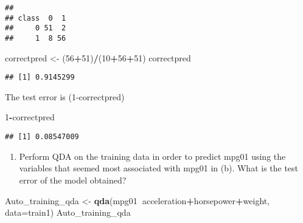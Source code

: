 \documentclass[]{article}
\newenvironment{Shaded}{\begin{snugshade}}{\end{snugshade}}
\newcommand{\KeywordTok}[1]{\textcolor[rgb]{0.13,0.29,0.53}{\textbf{#1}}}
\newcommand{\DataTypeTok}[1]{\textcolor[rgb]{0.13,0.29,0.53}{#1}}
\newcommand{\DecValTok}[1]{\textcolor[rgb]{0.00,0.00,0.81}{#1}}
\newcommand{\StringTok}[1]{\textcolor[rgb]{0.31,0.60,0.02}{#1}}
\newcommand{\CommentTok}[1]{\textcolor[rgb]{0.56,0.35,0.01}{\textit{#1}}}
\newcommand{\OperatorTok}[1]{\textcolor[rgb]{0.81,0.36,0.00}{\textbf{#1}}}
\newcommand{\NormalTok}[1]{#1}
\providecommand{\tightlist}{%
  \setlength{\itemsep}{0pt}\setlength{\parskip}{0pt}}
\begin{document}
\begin{Shaded}
\end{Shaded}

\begin{verbatim}
##      
## class  0  1
##     0 51  2
##     1  8 56
\end{verbatim}

\begin{Shaded}
\begin{Highlighting}[]
\NormalTok{correctpred <-}\StringTok{ }\NormalTok{(}\DecValTok{56}\OperatorTok{+}\DecValTok{51}\NormalTok{)}\OperatorTok{/}\NormalTok{(}\DecValTok{10}\OperatorTok{+}\DecValTok{56}\OperatorTok{+}\DecValTok{51}\NormalTok{)}
\NormalTok{correctpred}
\end{Highlighting}
\end{Shaded}

\begin{verbatim}
## [1] 0.9145299
\end{verbatim}

The test error is (1-correctpred)

\begin{Shaded}
\begin{Highlighting}[]
\DecValTok{1}\OperatorTok{-}\NormalTok{correctpred}
\end{Highlighting}
\end{Shaded}

\begin{verbatim}
## [1] 0.08547009
\end{verbatim}

\begin{enumerate}
\def\labelenumi{(\alph{enumi})}
\setcounter{enumi}{4}
\tightlist
\item
  Perform QDA on the training data in order to predict mpg01 using the
  variables that seemed most associated with mpg01 in (b). What is the
  test error of the model obtained?
\end{enumerate}

\begin{Shaded}
\begin{Highlighting}[]
\NormalTok{Auto_training_qda <-}\StringTok{ }\KeywordTok{qda}\NormalTok{(mpg01}\OperatorTok{~}\NormalTok{acceleration}\OperatorTok{+}\NormalTok{horsepower}\OperatorTok{+}\NormalTok{weight, }\DataTypeTok{data=}\NormalTok{train1)}
\NormalTok{Auto_training_qda}
\end{Highlighting}
\end{Shaded}
\end{document}
